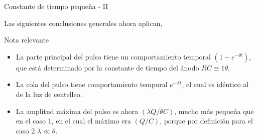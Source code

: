 \documentclass[a4paper,10pt]{beamer}
\begin{document}
\begin{frame}{Constante de tiempo pequeña - II}
 
 Las siguientes conclusiones generales ahora aplican,
 
 \begin{block}{Nota relevante}
  \begin{itemize}[<+->]
   \item \begin{justify}
          La parte principal del pulso tiene un comportamiento temporal $(1 - e^{-\theta t})$, 
          que está determinado por la constante de tiempo del ánodo $RC \equiv 1\theta$.
         \end{justify}
   \item \begin{justify}
          La cola del pulso tiene comportamiento temporal $e^{-\lambda t}$, el cual 
          es idéntico al de la luz de centelleo.
         \end{justify}
     \item \begin{justify}
          La amplitud máxima del pulso es ahora $(\lambda Q/\theta C)$, mucho más 
          pequeña que en el caso 1, en el cual el máximo era $(Q/C)$, porque por 
          definición para el caso 2 $\lambda \ll \theta$.
         \end{justify}      
  \end{itemize}
 \end{block}
\end{frame}
\end{document}
